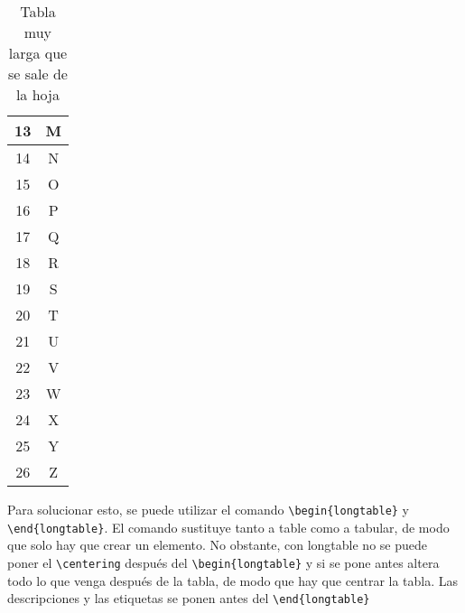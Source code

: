 \begin{table}[H]
\begin{tabular}{|c|c|}
		\hline
		13 & M \\
		\hline
		14 & N \\
		\hline
		15 & O \\
		\hline
		16 & P \\
		\hline
		17 & Q \\
		\hline
		18 & R \\
		\hline
		19 & S \\
		\hline
		20 & T \\
		\hline
		21 & U \\
		\hline
		22 & V \\
		\hline
		23 & W \\
		\hline
		24 & X \\
		\hline
		25 & Y \\
		\hline
		26 & Z \\
		\hline
	\end{tabular}
	\caption[Tabla muy larga]{Tabla muy larga que se sale de la hoja}
	\label{table_3}
\end{table}

Para solucionar esto, se puede utilizar el comando \verb!\begin{longtable}! y \verb!\end{longtable}!. El comando sustituye tanto a table como a tabular, de modo que solo hay que crear un elemento. No obstante, con longtable no se puede poner el \verb!\centering! después del \verb!\begin{longtable}! y si se pone antes altera todo lo que venga después de la tabla, de modo que hay que centrar la tabla. Las descripciones y las etiquetas se ponen antes del \verb!\end{longtable}!

